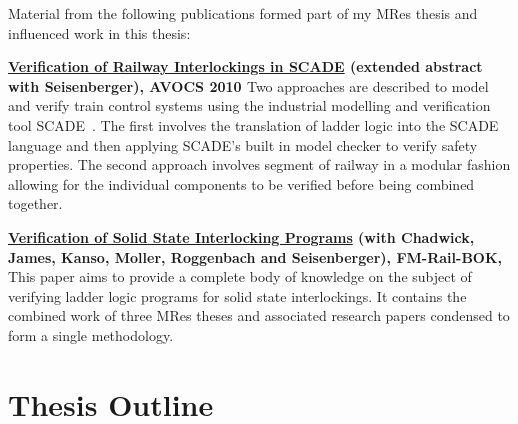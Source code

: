 Material from the following publications formed part of my MRes thesis and influenced work in this thesis:

\textbf{\ul{Verification of Railway Interlockings in SCADE} (extended abstract with Seisenberger), AVOCS 2010 \cite{AL10}} 
Two approaches are described to model and verify train control systems using the industrial modelling and verification tool SCADE~\cite{Scade}. The first involves the translation of ladder logic into the SCADE language and then applying SCADE's built in model checker to verify safety properties. The second approach involves segment of railway in a modular fashion allowing for the individual components to be verified before being combined together.


\textbf{\ul{Verification of Solid State Interlocking Programs} (with Chadwick, James, Kanso, Moller, Roggenbach and Seisenberger), FM-Rail-BOK, \cite{AL14a}}
This paper aims to provide a complete body of knowledge on the subject of verifying ladder logic programs for solid state interlockings. It contains the combined work of three MRes theses and associated research papers condensed to form a single methodology.


\section{Thesis Outline}

